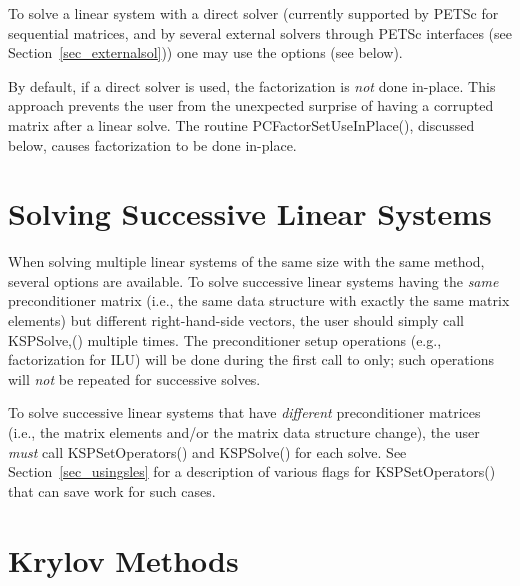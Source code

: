 To solve a linear system with a direct solver (currently supported 
by PETSc for sequential matrices, and by several external solvers through
PETSc interfaces (see Section~\ref{sec_externalsol})) one may use the options
    
(see below).

By default, if a direct solver is used, the factorization is {\em not} done 
in-place. This approach prevents the user from the unexpected surprise
of having a corrupted matrix after a linear solve. The routine 
PCFactorSetUseInPlace(), discussed below, causes factorization to 
be done in-place.  

\section{Solving Successive Linear Systems}

When solving multiple linear systems of the same size with the same
method, several options are available.  To solve successive linear
systems having the {\em same} preconditioner matrix (i.e., the same
data structure with exactly the same matrix elements) but different
right-hand-side vectors, the user should simply call KSPSolve,()
multiple times.  The preconditioner setup operations (e.g.,
factorization for ILU) will be done during the first call to  only; such operations will {\em not} be repeated for
successive solves.

To solve successive linear systems that have {\em different}
preconditioner matrices (i.e., the matrix elements and/or the matrix
data structure change), the user {\em must} call 
KSPSetOperators() and KSPSolve() for each solve.  See
Section~\ref{sec_usingsles} for a description of various flags for
KSPSetOperators() that can save work for such cases.

\section{Krylov Methods}
\label{sec_ksp}

